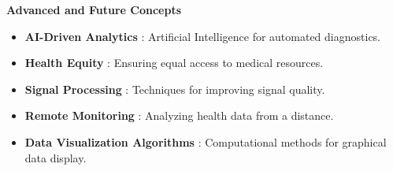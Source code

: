 \vspace{0.5cm}

\begin{center}
  \textbf{Advanced and Future Concepts} 
\end{center}

\begin{itemize}
  \item[] \textbf{AI-Driven Analytics} : Artificial Intelligence for automated diagnostics.
  \item[] \textbf{Health Equity} : Ensuring equal access to medical resources.
  \item[] \textbf{Signal Processing} : Techniques for improving signal quality.
  \item[] \textbf{Remote Monitoring} : Analyzing health data from a distance.
  \item[] \textbf{Data Visualization Algorithms} : Computational methods for graphical data display.
\end{itemize}
